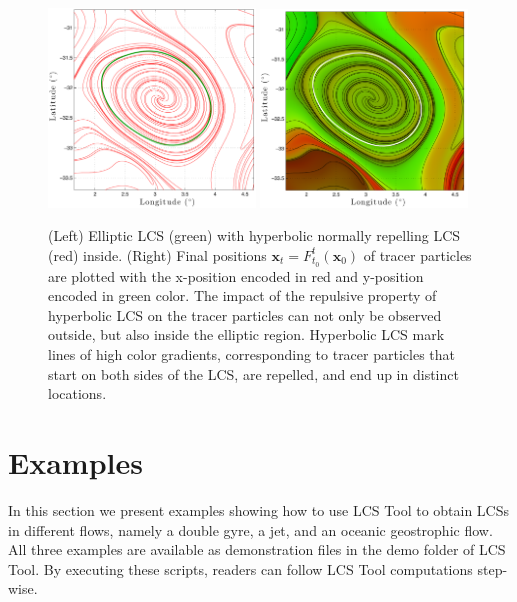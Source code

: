 \documentclass{article}
\begin{document}
\begin{figure}[hbt]
\centering
\includegraphics[width=0.49\textwidth]{graphics/ocean_dataset/LCS_fwd_coherent_eddy}
\includegraphics[width=0.49\textwidth]{graphics/ocean_dataset/LCS_fwd_colortracer}
\caption{(Left) Elliptic LCS (green) with hyperbolic normally repelling LCS (red) inside. (Right) Final positions $\boldsymbol x_t = F_{t_0}^t(\boldsymbol x_0)$ of tracer particles are plotted with the x-position encoded in red and y-position encoded in green color. The impact of the repulsive property of hyperbolic LCS on the tracer particles can not only be observed outside, but also inside the elliptic region. Hyperbolic LCS mark lines of high color gradients, corresponding to tracer particles that start on both sides of the LCS, are repelled, and end up in distinct locations.}
\label{fig:ocean_dataset_colortracer}
\end{figure}

\clearpage

\section{Examples}
In this section we present examples showing how to use LCS Tool to obtain LCSs in different flows, namely a double gyre, a jet, and an oceanic geostrophic flow. All three examples are available as demonstration files in the demo folder of LCS Tool. By executing these scripts, readers can follow LCS Tool computations step-wise.
\end{document}

